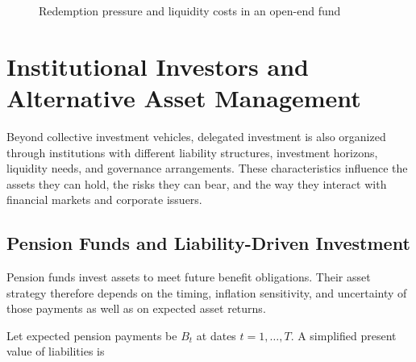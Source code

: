 \begin{figure}[H]
\centering
{}
\caption{Redemption pressure and liquidity costs in an open-end fund}
\label{fig:ch14-redemption-liquidity}
\end{figure}

\section{Institutional Investors and Alternative Asset Management}

Beyond collective investment vehicles, delegated investment is also organized through institutions with different liability structures, investment horizons, liquidity needs, and governance arrangements. These characteristics influence the assets they can hold, the risks they can bear, and the way they interact with financial markets and corporate issuers.

\subsection{Pension Funds and Liability-Driven Investment}

Pension funds invest assets to meet future benefit obligations. Their asset strategy therefore depends on the timing, inflation sensitivity, and uncertainty of those payments as well as on expected asset returns.

Let expected pension payments be $B_t$ at dates $t=1,\ldots,T$. A simplified present value of liabilities is

